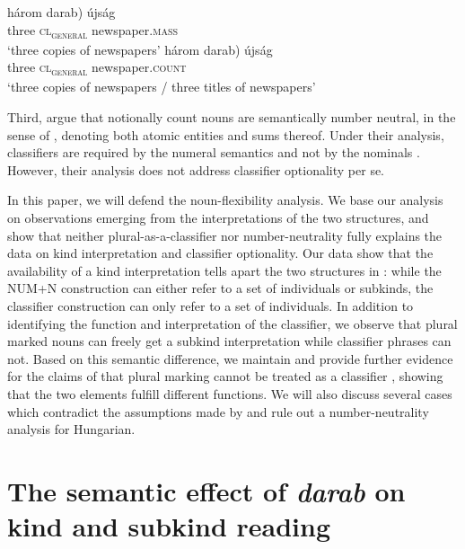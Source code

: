 \documentclass[output=paper]{langscibook}
\begin{document}
\ea \label{schv-nem:ex:7}
\ea \label{schv-nem:ex:7a}
\gll három \minsp{*(} darab) újság\\ %
three {} \textsc{cl\textsubscript{general}} newspaper.\textsc{mass}\\
\glt `three copies of newspapers' 
\ex \label{schv-nem:ex:7b}
\gll három  \minsp{(*} darab) újság\\ %
three {} \textsc{cl\textsubscript{general}}  newspaper.\textsc{count}\\
\glt `three copies of newspapers /  three titles of newspapers'
\z
\z

\noindent Third, \citet{erbach-etal-19} argue that notionally count nouns are semantically number neutral, in the sense of \citet{farkas-deswart-10}, denoting both atomic entities and sums thereof. Under their analysis, classifiers are required by the numeral semantics and not by the nominals \citep{krifka-95, sudo-17}. However, their analysis does not address classifier optionality per se.

In this paper, we will defend the noun-flexibility analysis. We base our analysis on observations emerging from the interpretations of the two structures, and show that neither plural-as-a-classifier nor number-neutrality fully explains the data on kind interpretation and classifier optionality.  Our data show that the availability of a kind interpretation tells apart the two structures in : while the NUM+N construction  can either refer to a set of individuals or subkinds, the classifier construction  can only refer to a set of individuals. In addition to identifying the function and interpretation of the classifier, we observe that plural marked nouns can freely get a subkind interpretation while classifier phrases can not. Based on this semantic difference, we maintain and provide further evidence for the claims of \citet{schvarcz-rothstein-17} that plural marking cannot be treated as a classifier \citep[contra][]{dekany-11}, showing that the two elements fulfill different functions.  We will also discuss several cases which contradict the assumptions made by  \citet{erbach-etal-19} and  rule out a number-neutrality analysis for Hungarian. 

\section{The semantic effect of \textit{darab} on kind and subkind reading} \label{schv-nem:sec:2}\largerpage[2]
\end{document}
